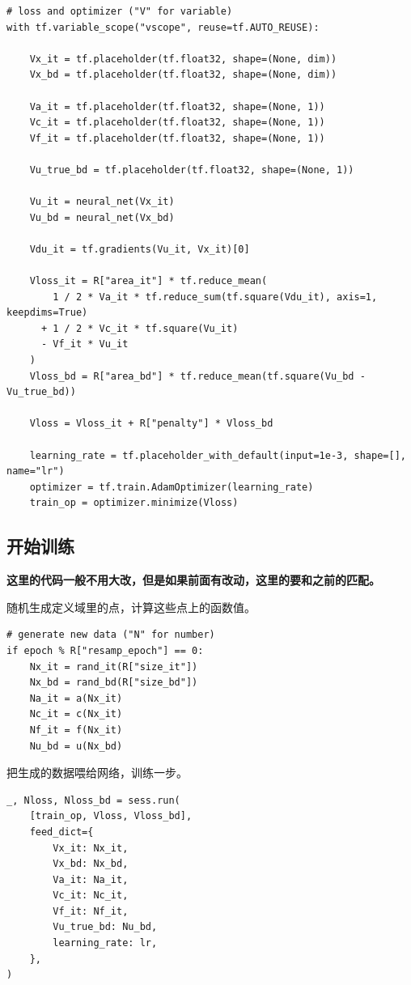 \documentclass[12pt,a4paper]{article}
\begin{document}
\begin{lstlisting}
# loss and optimizer ("V" for variable)
with tf.variable_scope("vscope", reuse=tf.AUTO_REUSE):

    Vx_it = tf.placeholder(tf.float32, shape=(None, dim))
    Vx_bd = tf.placeholder(tf.float32, shape=(None, dim))

    Va_it = tf.placeholder(tf.float32, shape=(None, 1))
    Vc_it = tf.placeholder(tf.float32, shape=(None, 1))
    Vf_it = tf.placeholder(tf.float32, shape=(None, 1))

    Vu_true_bd = tf.placeholder(tf.float32, shape=(None, 1))

    Vu_it = neural_net(Vx_it)
    Vu_bd = neural_net(Vx_bd)

    Vdu_it = tf.gradients(Vu_it, Vx_it)[0]

    Vloss_it = R["area_it"] * tf.reduce_mean(
        1 / 2 * Va_it * tf.reduce_sum(tf.square(Vdu_it), axis=1, keepdims=True)
      + 1 / 2 * Vc_it * tf.square(Vu_it)
      - Vf_it * Vu_it
    )
    Vloss_bd = R["area_bd"] * tf.reduce_mean(tf.square(Vu_bd - Vu_true_bd))

    Vloss = Vloss_it + R["penalty"] * Vloss_bd

    learning_rate = tf.placeholder_with_default(input=1e-3, shape=[], name="lr")
    optimizer = tf.train.AdamOptimizer(learning_rate)
    train_op = optimizer.minimize(Vloss)
\end{lstlisting}

\subsection*{开始训练}

\textbf{这里的代码一般不用大改，但是如果前面有改动，这里的要和之前的匹配。}

随机生成定义域里的点，计算这些点上的函数值。
\begin{lstlisting}
# generate new data ("N" for number)
if epoch % R["resamp_epoch"] == 0:
    Nx_it = rand_it(R["size_it"])
    Nx_bd = rand_bd(R["size_bd"])
    Na_it = a(Nx_it)
    Nc_it = c(Nx_it)
    Nf_it = f(Nx_it)
    Nu_bd = u(Nx_bd)
\end{lstlisting}

把生成的数据喂给网络，训练一步。
\begin{lstlisting}
_, Nloss, Nloss_bd = sess.run(
    [train_op, Vloss, Vloss_bd],
    feed_dict={
        Vx_it: Nx_it,
        Vx_bd: Nx_bd,
        Va_it: Na_it,
        Vc_it: Nc_it,
        Vf_it: Nf_it,
        Vu_true_bd: Nu_bd,
        learning_rate: lr,
    },
)
\end{lstlisting}
\end{document}
